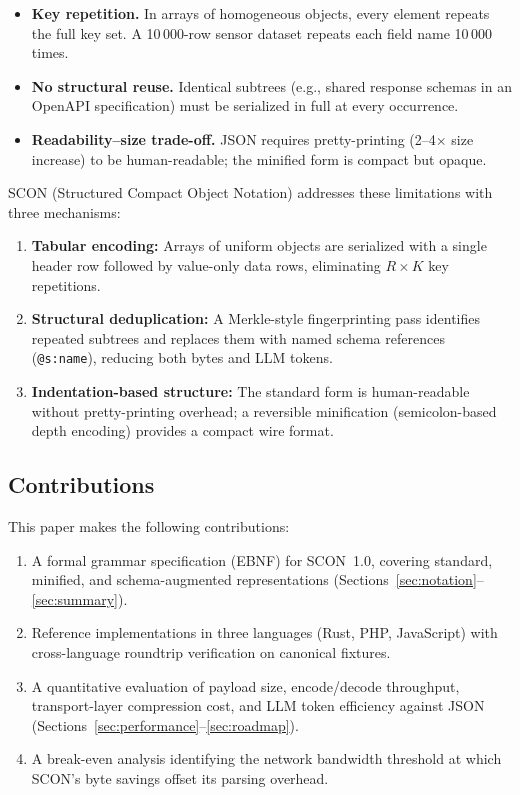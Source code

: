 \documentclass[11pt, a4paper]{article}
\begin{document}
\begin{itemize}
\item \textbf{Key repetition.} In arrays of homogeneous objects, every
      element repeats the full key set. A 10\,000-row sensor dataset
      repeats each field name 10\,000 times.
\item \textbf{No structural reuse.} Identical subtrees (e.g., shared
      response schemas in an OpenAPI specification) must be serialized
      in full at every occurrence.
\item \textbf{Readability--size trade-off.} JSON requires pretty-printing
      (2--4$\times$ size increase) to be human-readable; the minified
      form is compact but opaque.
\end{itemize}

\noindent SCON (Structured Compact Object Notation) addresses these
limitations with three mechanisms:

\begin{enumerate}
\item \textbf{Tabular encoding:} Arrays of uniform objects are serialized
      with a single header row followed by value-only data rows,
      eliminating $R \times K$ key repetitions.
\item \textbf{Structural deduplication:} A Merkle-style fingerprinting
      pass identifies repeated subtrees and replaces them with named
      schema references (\texttt{@s:name}), reducing both bytes and
      LLM tokens.
\item \textbf{Indentation-based structure:} The standard form is
      human-readable without pretty-printing overhead; a reversible
      minification (semicolon-based depth encoding) provides a compact
      wire format.
\end{enumerate}

\subsection{Contributions}

This paper makes the following contributions:

\begin{enumerate}
\item A formal grammar specification (EBNF) for SCON~1.0, covering
      standard, minified, and schema-augmented representations
      (Sections~\ref{sec:notation}--\ref{sec:summary}).
\item Reference implementations in three languages (Rust, PHP,
      JavaScript) with cross-language roundtrip verification on
      canonical fixtures.
\item A quantitative evaluation of payload size, encode/decode
      throughput, transport-layer compression cost, and LLM token
      efficiency against JSON
      (Sections~\ref{sec:performance}--\ref{sec:roadmap}).
\item A break-even analysis identifying the network bandwidth threshold
      at which SCON's byte savings offset its parsing overhead.
\end{enumerate}
\end{document}
